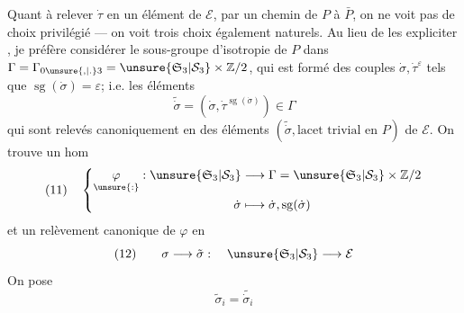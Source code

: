 Quant à relever $\dot\tau$ en un élément de $\mathcal E$, par un chemin de $P$ à $\bar P$, on ne voit pas de choix privilégié --- on voit trois choix également naturels. Au lieu de les expliciter , je préfère considérer le sous-groupe d'isotropie de $P$ dans $\Gamma=\Gamma_{0\unsure{,|.}3}=\unsure{\mathfrak S_3|\mathcal S_3}\times\mathbb Z/2$, qui est formé des couples $\dot\sigma,\dot\tau^\varepsilon$ tels que $\operatorname{sg}(\dot\sigma)=\varepsilon$;  i.e. les éléments
\[
\widetilde{\dot\sigma}=(\dot\sigma,\dot\tau^{\operatorname{sg}(\dot\sigma)})\in\Gamma
\]
qui sont relevés canoniquement en des éléments $(\widetilde{\dot\sigma},\text{lacet trivial en }P)$ de $\mathcal E$. On trouve un hom
\[
(11)\quad\left\{\begin{aligned}
\underset{\unsure{:}}{\varphi}:\unsure{\mathfrak S_3|\mathcal S_3}&\longrightarrow\Gamma=\unsure{\mathfrak S_3|\mathcal S_3}\times\mathbb Z/2\\
\dot\sigma&\longmapsto\dot\sigma,\operatorname{sg}(\dot\sigma)
\end{aligned}\right.
\]
et un relèvement canonique de $\varphi$ en
\[
(12)\qquad\sigma\longrightarrow\tilde\sigma:\quad\unsure{\mathfrak S_3|\mathcal S_3}\longrightarrow\mathcal E
\]
On pose
\[
\tilde\sigma_i=\widetilde{\dot\sigma_i}
\]
